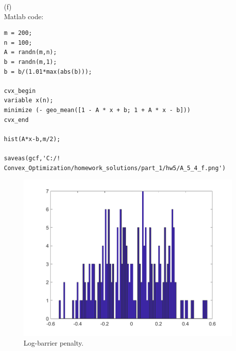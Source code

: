 \documentclass{article}
\begin{document}
(f)\\
Matlab code:

\begin{verbatim}
m = 200;
n = 100;
A = randn(m,n);
b = randn(m,1);
b = b/(1.01*max(abs(b)));

cvx_begin
variable x(n);
minimize (- geo_mean([1 - A * x + b; 1 + A * x - b]))
cvx_end

hist(A*x-b,m/2);

saveas(gcf,'C:/! Convex_Optimization/homework_solutions/part_1/hw5/A_5_4_f.png')
\end{verbatim}

\begin{figure}[H]
	\includegraphics[width=\linewidth]{A_5_4_f.png}
	\caption{Log-barrier penalty.}
\end{figure}
\end{document}
